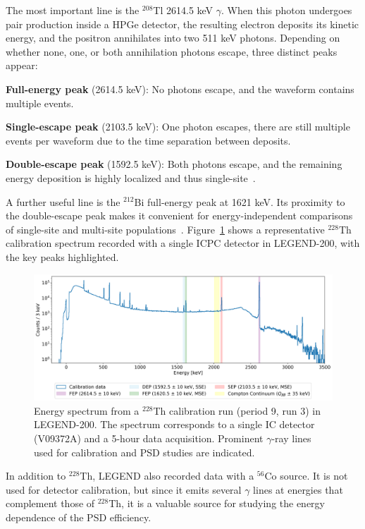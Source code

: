 The most important line is the $^{208}$Tl 2614.5 keV $\gamma$. When this photon undergoes pair production inside a HPGe detector, the resulting electron deposits its kinetic energy, and the positron annihilates into two 511 keV photons. Depending on whether none, one, or both annihilation photons escape, three distinct peaks appear: 

\noindent \textbf{Full-energy peak} (2614.5 keV): No photons escape, and the waveform contains multiple events. 

\noindent \textbf{Single-escape peak} (2103.5 keV): One photon escapes, there are still multiple events per waveform due to the time separation between deposits. 

\noindent \textbf{Double-escape peak} (1592.5 keV): Both photons escape, and the remaining energy deposition is highly localized and thus single-site~\cite{baudis_calibration_2023, agostini_pulse_2022}.

A further useful line is the $^{212}$Bi full-energy peak at 1621 keV. Its proximity to the double-escape peak makes it convenient for energy-independent comparisons of single-site and multi-site populations~\cite{agostini_pulse_2022}. Figure~\ref{fig:Calibration_spectrum_Th228} shows a representative $^{228}$Th calibration spectrum recorded with a single ICPC detector in LEGEND-200, with the key peaks highlighted.   


\begin{figure}
    \centering
    \includegraphics[width=\linewidth]{figures/03_legend/Calibration_spectrum_Th228_V09372A.png}
    \caption{Energy spectrum from a $^{228}$Th calibration run (period 9, run 3) in LEGEND-200. The spectrum corresponds to a single IC detector (V09372A) and a 5-hour data acquisition. Prominent $\gamma$-ray lines used for calibration and PSD studies are indicated.}
    \label{fig:Calibration_spectrum_Th228}
\end{figure}


In addition to $^{228}$Th, LEGEND also recorded data with a $^{56}$Co source. It is not used for detector calibration, but since it emits several $\gamma$ lines at energies that complement those of $^{228}$Th, it is a valuable source for studying the energy dependence of the PSD efficiency. 



